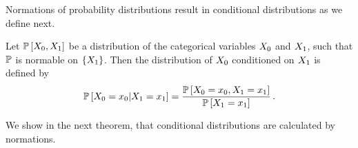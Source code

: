 Normations of probability distributions result in conditional distributions as we define next.

\begin{definition}\label{def:conditionalProbability}
	Let $\mathbb{P}\left[X_{0},X_{1}\right]$ be a distribution of the categorical variables $X_{0}$ and $X_{1}$, such that $\mathbb{P}$ is normable on $\{X_{1}\}$.
	Then the distribution of $X_{0}$ conditioned on $X_{1}$ is defined by
		\[ \mathbb{P}\left[X_{0}=x_{0}|X_{1}=x_{1}\right]  
		= \frac{\mathbb{P}\left[X_{0}=x_{0},X_{1}=x_{1}\right]}{\mathbb{P}\left[X_{1}=x_{1}\right]} \, . \]
\end{definition}

%	

We show in the next theorem, that conditional distributions are calculated by normations.

